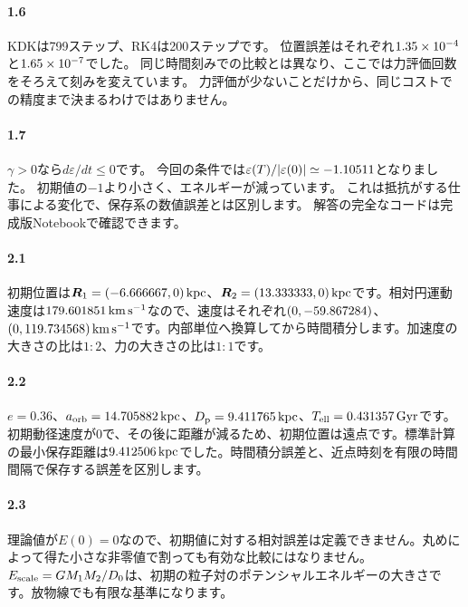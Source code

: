\paragraph{1.6}
KDKは799ステップ、RK4は200ステップです。
位置誤差はそれぞれ$1.35\times 10^{-4}$と$1.65\times 10^{-7}$でした。
同じ時間刻みでの比較とは異なり、ここでは力評価回数をそろえて刻みを変えています。
力評価が少ないことだけから、同じコストでの精度まで決まるわけではありません。

\paragraph{1.7}
$\gamma>0$なら$d\varepsilon/dt\le0$です。
今回の条件では$\varepsilon(T)/|\varepsilon(0)|\simeq-1.10511$となりました。
初期値の$-1$より小さく、エネルギーが減っています。
これは抵抗がする仕事による変化で、保存系の数値誤差とは区別します。
解答の完全なコードは完成版Notebookで確認できます。



\paragraph{2.1}
初期位置は$\boldsymbol R_1=(-6.666667,0)\,\mathrm{kpc}$、$\boldsymbol R_2=(13.333333,0)\,\mathrm{kpc}$です。相対円運動速度は$179.601851\,\mathrm{km\,s^{-1}}$なので、速度はそれぞれ$(0,-59.867284)$、$(0,119.734568)\,\mathrm{km\,s^{-1}}$です。内部単位へ換算してから時間積分します。加速度の大きさの比は$1:2$、力の大きさの比は$1:1$です。

\paragraph{2.2}
$e=0.36$、$a_{\rm orb}=14.705882\,\mathrm{kpc}$、$D_{\rm p}=9.411765\,\mathrm{kpc}$、$T_{\rm ell}=0.431357\,\mathrm{Gyr}$です。初期動径速度が0で、その後に距離が減るため、初期位置は遠点です。標準計算の最小保存距離は$9.412506\,\mathrm{kpc}$でした。時間積分誤差と、近点時刻を有限の時間間隔で保存する誤差を区別します。

\paragraph{2.3}
理論値が$E(0)=0$なので、初期値に対する相対誤差は定義できません。丸めによって得た小さな非零値で割っても有効な比較にはなりません。$E_{\rm scale}=GM_1M_2/D_0$は、初期の粒子対のポテンシャルエネルギーの大きさです。放物線でも有限な基準になります。

